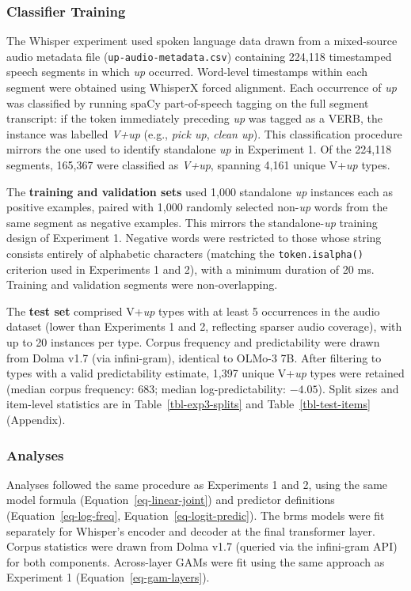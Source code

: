 \documentclass[11pt]{article}
\begin{document}
\subsubsection{Classifier Training}\label{classifier-training-2}

The Whisper experiment used spoken language data drawn from a
mixed-source audio metadata file (\texttt{up-audio-metadata.csv})
containing 224,118 timestamped speech segments in which \emph{up}
occurred. Word-level timestamps within each segment were obtained using
WhisperX forced alignment. Each occurrence of \emph{up} was classified
by running spaCy part-of-speech tagging on the full segment transcript:
if the token immediately preceding \emph{up} was tagged as a VERB, the
instance was labelled \emph{V+up} (e.g., \emph{pick up}, \emph{clean
up}). This classification procedure mirrors the one used to identify
standalone \emph{up} in Experiment 1. Of the 224,118 segments, 165,367
were classified as \emph{V+up}, spanning 4,161 unique V+\emph{up} types.

The \textbf{training and validation sets} used 1,000 standalone
\emph{up} instances each as positive examples, paired with 1,000
randomly selected non-\emph{up} words from the same segment as negative
examples. This mirrors the standalone-\emph{up} training design of
Experiment 1. Negative words were restricted to those whose string
consists entirely of alphabetic characters (matching the
\texttt{token.isalpha()} criterion used in Experiments 1 and 2), with a
minimum duration of 20 ms. Training and validation segments were
non-overlapping.

The \textbf{test set} comprised V+\emph{up} types with at least 5
occurrences in the audio dataset (lower than Experiments 1 and 2,
reflecting sparser audio coverage), with up to 20 instances per type.
Corpus frequency and predictability were drawn from Dolma v1.7 (via
infini-gram), identical to OLMo-3 7B. After filtering to types with a
valid predictability estimate, 1,397 unique V+\emph{up} types were
retained (median corpus frequency: 683; median log-predictability:
\(-4.05\)). Split sizes and item-level statistics are in
Table~\ref{tbl-exp3-splits} and Table~\ref{tbl-test-items} (Appendix).

\subsubsection{Analyses}\label{analyses-2}

Analyses followed the same procedure as Experiments 1 and 2, using the
same model formula (Equation~\ref{eq-linear-joint}) and predictor
definitions (Equation~\ref{eq-log-freq},
Equation~\ref{eq-logit-predic}). The brms models were fit separately for
Whisper's encoder and decoder at the final transformer layer. Corpus
statistics were drawn from Dolma v1.7 (queried via the infini-gram API)
for both components. Across-layer GAMs were fit using the same approach
as Experiment 1 (Equation~\ref{eq-gam-layers}).
\end{document}
